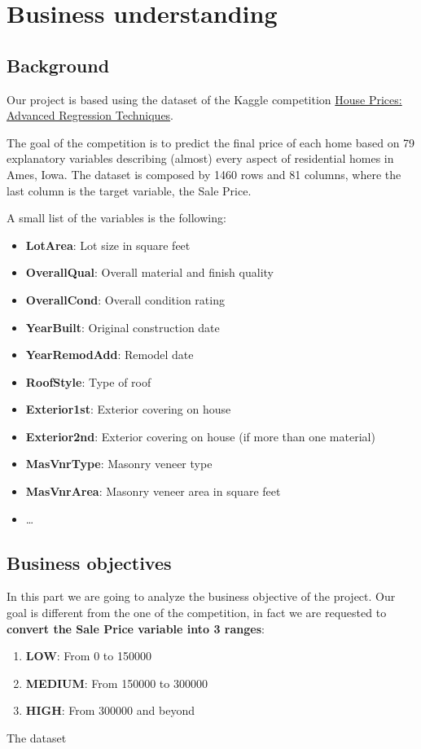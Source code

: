 \section{Business understanding}
\label{sec:business_understanding}

\subsection{Background}
Our project is based using the dataset of the Kaggle competition \href{https://www.kaggle.com/c/house-prices-advanced-regression-techniques}{House Prices: Advanced Regression Techniques}. 

The goal of the competition is to predict the final price of each home based on 79 explanatory variables describing (almost) every aspect of residential homes in Ames, Iowa.
The dataset is composed by 1460 rows and 81 columns, where the last column is the target variable, the Sale Price.

A small list of the variables is the following:

\begin{itemize}
    \item \textbf{LotArea}: Lot size in square feet
    \item \textbf{OverallQual}: Overall material and finish quality
    \item \textbf{OverallCond}: Overall condition rating
    \item \textbf{YearBuilt}: Original construction date
    \item \textbf{YearRemodAdd}: Remodel date
    \item \textbf{RoofStyle}: Type of roof
    \item \textbf{Exterior1st}: Exterior covering on house
    \item \textbf{Exterior2nd}: Exterior covering on house (if more than one material)
    \item \textbf{MasVnrType}: Masonry veneer type
    \item \textbf{MasVnrArea}: Masonry veneer area in square feet
    \item \dots
\end{itemize}
\subsection{Business objectives}
\label{subsec:business_objectives}

In this part we are going to analyze the business objective of the project.
Our goal is different from the one of the competition, in fact we are requested to \textbf{convert the Sale Price variable into 3 ranges}:

\begin{enumerate}
    \item \textbf{LOW}: From 0 to 150000 
    \item \textbf{MEDIUM}: From 150000 to 300000 
    \item \textbf{HIGH}: From 300000 and beyond 
\end{enumerate}

The dataset 
